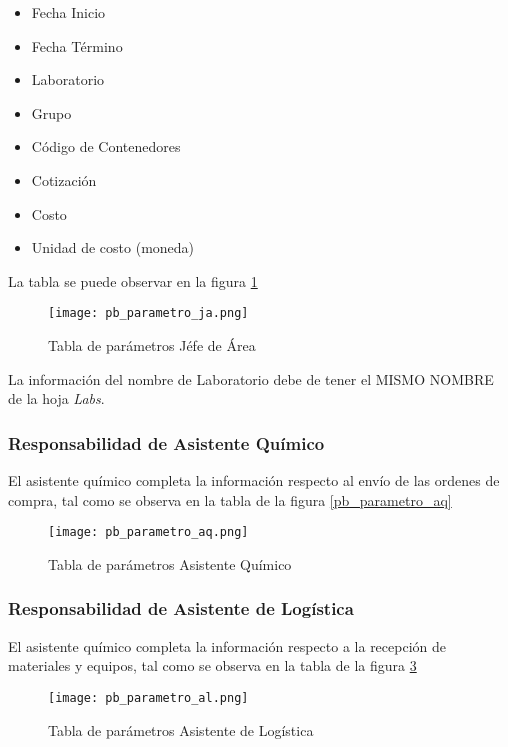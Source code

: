 \begin{itemize}
	\item Fecha Inicio
	\item Fecha Término
	\item Laboratorio
	\item Grupo
	\item Código de Contenedores
	\item Cotización
	\item Costo
	\item Unidad de costo (moneda)
\end{itemize}

La tabla se puede observar en la figura \ref{pb_parametro_ja}

\begin{figure}
	\centering
	\texttt{[image: pb\_parametro\_ja.png]}
	\caption{Tabla de parámetros Jéfe de Área}
	\label{pb_parametro_ja}
\end{figure}

La información del nombre de Laboratorio debe de tener el \MakeUppercase{mismo nombre} de la hoja \textit{Labs}.

\subsubsection{Responsabilidad de Asistente Químico}

El asistente químico completa la información respecto al envío de las ordenes de compra, tal como se observa en la tabla de la figura \ref{pb_parametro_aq}

\begin{figure}
	\centering
	\texttt{[image: pb\_parametro\_aq.png]}
	\caption{Tabla de parámetros Asistente Químico}
	\label{pb_parametro_jq}
\end{figure}

\subsubsection{Responsabilidad de Asistente de Logística}

El asistente químico completa la información respecto a la recepción de materiales y equipos, tal como se observa en la tabla de la figura \ref{pb_parametro_al}

\begin{figure}
	\centering
	\texttt{[image: pb\_parametro\_al.png]}
	\caption{Tabla de parámetros Asistente de Logística}
	\label{pb_parametro_al}
\end{figure}

